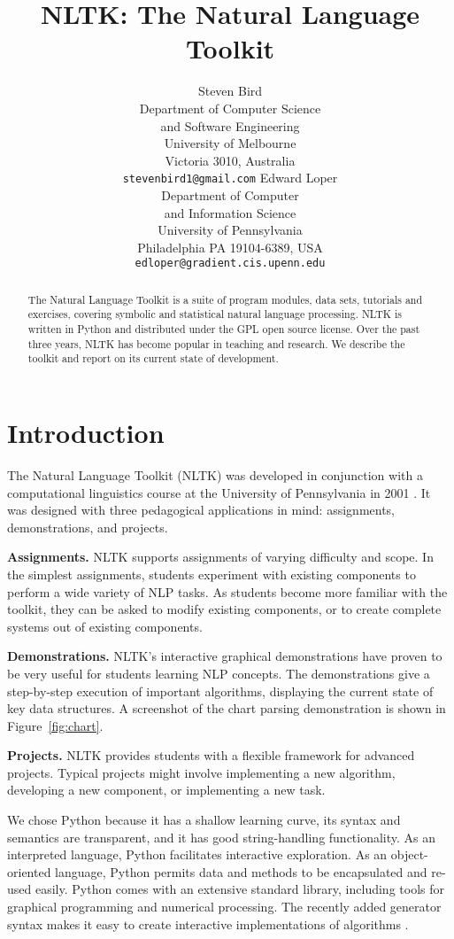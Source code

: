 \documentclass[11pt]{article}
\title{NLTK: The Natural Language Toolkit}
\author{
  Steven Bird \\
  Department of Computer Science \\
  \indent and Software Engineering \\
  University of Melbourne \\
  Victoria 3010, Australia \\  
  {\tt\small stevenbird1@gmail.com}
\And
  Edward Loper\\
  Department of Computer \\
  \indent and Information Science \\
  University of Pennsylvania\\
  Philadelphia PA 19104-6389, USA\\
  {\tt\small edloper@gradient.cis.upenn.edu}
}
\begin{document}
\maketitle

\begin{abstract}\small
  The Natural Language Toolkit is a suite of program modules, data
  sets, tutorials and exercises, covering symbolic and statistical
  natural language processing.  NLTK is written in Python and
  distributed under the GPL open source license.  Over the past three
  years, NLTK has become popular in teaching and research.  We
  describe the toolkit and report on its current state of development.
\end{abstract}

\section{Introduction}

The Natural Language Toolkit (NLTK) was developed in conjunction with
a computational linguistics course at the University of Pennsylvania
in 2001 \cite{LoperBird02}.  It was designed with three pedagogical
applications in mind: assignments, demonstrations, and projects.

\textbf{Assignments.}
NLTK supports assignments of varying difficulty
and scope.  In the simplest assignments, students experiment with
existing components to perform a wide variety of NLP tasks.  As students
become more familiar with the toolkit, they can be asked to modify
existing components, or to create complete systems out of existing
components.

\textbf{Demonstrations.}
NLTK's interactive graphical demonstrations have proven to be very
useful for students learning NLP concepts.
The demonstrations give a step-by-step execution of important
algorithms, displaying the current state of key data structures.
A screenshot of the chart parsing demonstration is shown in Figure~\ref{fig:chart}.

\textbf{Projects.}  NLTK provides students with a flexible framework
for advanced projects.  Typical projects might involve implementing a
new algorithm, developing a new component, or implementing a new
task.

We chose Python because it has a shallow learning curve, its syntax
and semantics are transparent, and it has good string-handling
functionality.  As an interpreted language, Python facilitates
interactive exploration.  As an object-oriented language, Python
permits data and methods to be encapsulated and re-used easily.  Python comes with an extensive
standard library, including tools for graphical programming and
numerical processing.  The recently added generator
syntax makes it easy to create interactive implementations of
algorithms \cite{Loper04,Rossum03intro,Rossum03ref}.
\end{document}
